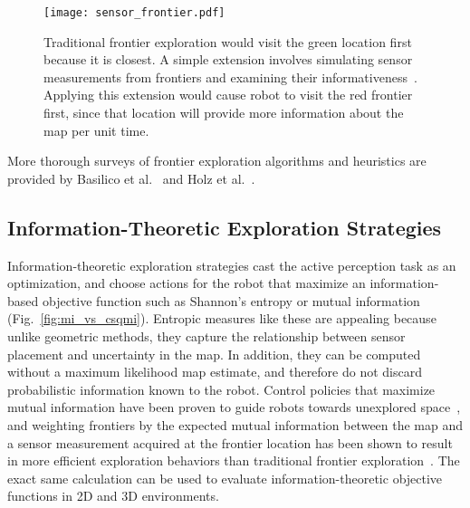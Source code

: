 \begin{figure}[t]
  \centering
  \centering
  \texttt{[image: sensor\_frontier.pdf]}
  \caption{Traditional frontier exploration would visit the green location first
    because it is closest. A simple extension involves simulating sensor
    measurements from frontiers and examining their informativeness~\cite{gonzalez2002navigation}. Applying this
    extension would cause robot to visit the red frontier first, since that
    location will provide more information about the map per unit time.\label{fig:sensor_frontier}}
\end{figure}

More thorough surveys of frontier exploration algorithms and heuristics are provided by
Basilico et al.~\cite{basilico2008evaluating} and Holz et al.~\cite{holz2011comparative}.

\subsection{Information-Theoretic Exploration Strategies}

Information-theoretic exploration strategies cast the active perception task as
an optimization, and choose actions for the robot that maximize an information-based objective function such
as Shannon's entropy or mutual
information~\cite{bourgault2002information,kollar2008efficient,charrow2015icra,julian2013mutual}
(Fig.~\ref{fig:mi_vs_csqmi}).
Entropic measures like these are appealing because unlike geometric methods,
they capture the relationship between sensor placement and uncertainty in the
map. In addition, they can be computed without a maximum likelihood map estimate, and
therefore do not discard probabilistic information known to the robot. Control policies
that maximize mutual information have been proven to guide robots
towards unexplored space~\cite{julian2013mutual}, and weighting frontiers by
the expected mutual information between the map and a sensor measurement
acquired at the frontier location has been shown to result in more efficient exploration
behaviors than traditional frontier exploration~\cite{charrow2015icra}.
The exact same calculation can be used to evaluate information-theoretic objective
functions in 2D and 3D environments.

